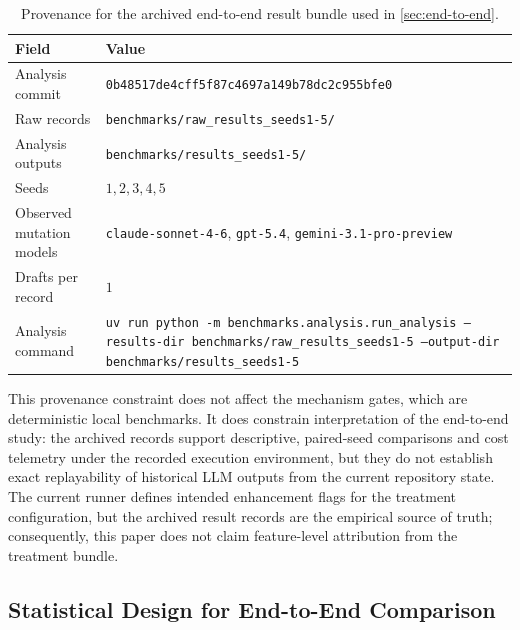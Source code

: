 \begin{table}[t]
  \centering
  \caption{Provenance for the archived end-to-end result bundle used in \cref{sec:end-to-end}.}
  \label{tab:result-provenance}
  \footnotesize
  \begin{tabular}{@{}p{3.0cm}p{13.0cm}@{}}
    \toprule
    Field & Value \\
    \midrule
    Analysis commit & \texttt{0b48517de4cff5f87c4697a149b78dc2c955bfe0} \\
    Raw records & \texttt{benchmarks/raw\_results\_seeds1-5/} \\
    Analysis outputs & \texttt{benchmarks/results\_seeds1-5/} \\
    Seeds & $1,2,3,4,5$ \\
    Observed mutation models & \texttt{claude-sonnet-4-6}, \texttt{gpt-5.4}, \texttt{gemini-3.1-pro-preview} \\
    Drafts per record & $1$ \\
    Analysis command & \texttt{uv run python -m benchmarks.analysis.run\_analysis --results-dir benchmarks/raw\_results\_seeds1-5 --output-dir benchmarks/results\_seeds1-5} \\
    \bottomrule
  \end{tabular}
\end{table}

This provenance constraint does not affect the mechanism gates, which are deterministic local benchmarks.
It does constrain interpretation of the end-to-end study: the archived records support descriptive, paired-seed comparisons and cost telemetry under the recorded execution environment, but they do not establish exact replayability of historical LLM outputs from the current repository state.
The current runner defines intended enhancement flags for the treatment configuration, but the archived result records are the empirical source of truth; consequently, this paper does not claim feature-level attribution from the treatment bundle.

\subsection{Statistical Design for End-to-End Comparison}
\label{sec:stat-design}

